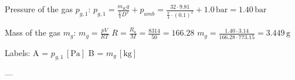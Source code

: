 Pressure of the gas \( p_{g,1} \):  
\( p_{g,1} = \frac{m_K g}{\frac{\pi}{4} D^2} + p_{amb} = \frac{32 \cdot 9.81}{\frac{\pi}{4} \cdot (0.1)^2} + 1.0 \, \text{bar} = 1.40 \, \text{bar} \)  

Mass of the gas \( m_g \):  
\( m_g = \frac{p V}{R T} \)  
\( R = \frac{R_u}{M} = \frac{8314}{50} = 166.28 \)  
\( m_g = \frac{1.40 \cdot 3.14}{166.28 \cdot 773.15} = 3.449 \, \text{g} \)  

Labels:  
A = \( p_{g,1} \, [\text{Pa}] \)  
B = \( m_g \, [\text{kg}] \)  

---